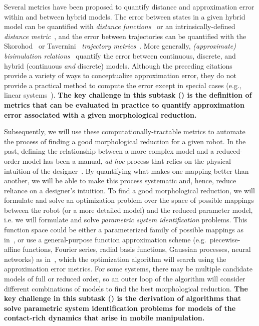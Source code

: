 \documentclass[11pt]{article}
\begin{document}
Several metrics have been proposed to quantify distance and approximation error within and between hybrid models.
The error between states in a given hybrid model can be quantified with \emph{distance functions}~ or an intrinsically-defined \emph{distance metric}~,
and the error between trajectories can be quantified with the Skorohod~ or Tavernini~  \emph{trajectory metrics}~. 
More generally, 
\emph{(approximate) bisimulation relations}~
quantify the error between continuous, discrete, and hybrid (continuous \emph{and} discrete) models.
Although the preceding citations provide a variety of ways to conceptualize approximation error, they do not provide a practical method to compute the error except in special cases (e.g., linear systems~\cite[Sec.~VIII]{Girard2007-ed}).
{\bf The key challenge in this subtask () is the definition of metrics that can be evaluated in practice to quantify approximation error associated with a given morphological reduction.}


Subsequently, we will use these computationally-tractable metrics to automate the process of finding a good morphological reduction for a given robot. 
In the past, defining the relationship between a more complex model and a reduced-order model has been a manual, {\emph{ad hoc}} process that relies on the physical intuition of the designer~\cite{paper:libby_tail_2016}.
By quantifying what makes one mapping better than another, we will be able to make this process systematic and, hence, reduce reliance on a designer's intuition.
To find a good morphological reduction, we will formulate and solve an optimization problem over the space of possible mappings between the robot (or a more detailed model) and the reduced parameter model, i.e. we will formulate and solve \emph{parametric system identification} problems. 
This function space could be either a parameterized family of possible mappings as in~\cite{Burden2012-nx, Buchan2013-gr}, or use a general-purpose function approximation scheme (e.g.\ piecewise-affine functions, Fourier series, radial basis functions, Gaussian processes, neural networks) as in~\cite{Uyanik2015-be, Elhamifar2014-fg}, which the optimization algorithm will search using the approximation error metrics. 
For some systems, there may be multiple candidate models of full or reduced order, so an outer loop of the algorithm will consider different combinations of models to find the best morphological reduction. 
{\bf The key challenge in this subtask () is the derivation of algorithms that solve parametric system identification problems for models of the contact-rich dynamics that arise in mobile manipulation.}
\end{document}
